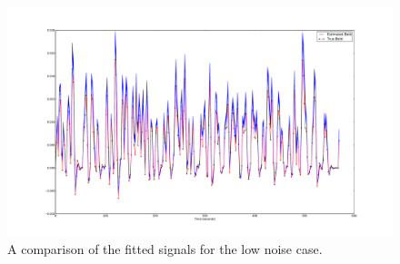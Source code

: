 \begin{figure}
\centering
\includegraphics[clip=true,trim=6cm 2cm 5cm 3.5cm,width=15cm]{images/comparison_lownoise}
\caption{A comparison of the fitted signals for the low noise case.}
\label{fig:FitComparisonLowNoise}
\end{figure}

